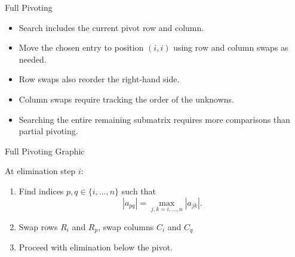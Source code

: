 \documentclass[10pt]{beamer}
\begin{document}
\begin{frame}{Full Pivoting}


\begin{itemize}
    \item Search includes the current pivot row and column.

    \item Move the chosen entry to position $(i,i)$
    using row and column swaps as needed.

    \item Row swaps also reorder the right-hand side.

    \item Column swaps require tracking the order
    of the unknowns.

    \item Searching the entire remaining submatrix
    requires more comparisons than partial pivoting.
\end{itemize}

\end{frame}
\begin{frame}{Full Pivoting Graphic}

\begin{center}
\end{center}
At elimination step $i$:
\begin{enumerate}
    \item Find indices $p,q\in\{i,\ldots,n\}$ such that
    \[
        |a_{pq}|=\max_{j,k=i,\ldots,n}|a_{jk}|.
    \]

    \item Swap rows $R_i$ and $R_p$, swap columns $C_i$ and $C_q$

    \item Proceed with elimination below the pivot.
\end{enumerate}
\end{frame}

\end{document}
